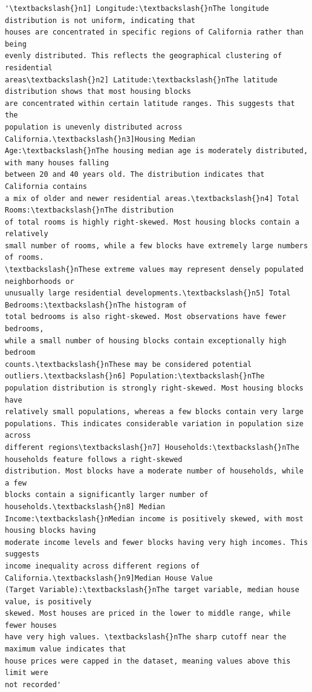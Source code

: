 \documentclass[11pt]{article}
\makeatletter
\newcommand{\boxspacing}{\kern\kvtcb@left@rule\kern\kvtcb@boxsep}
\newcommand{\prompt}[4]{
        {\ttfamily\llap{{\color{#2}[#3]:\hspace{3pt}#4}}\vspace{-\baselineskip}}
    }
\makeatother
\begin{document}
            \begin{tcolorbox}[breakable, size=fbox, boxrule=.5pt, pad at break*=1mm, opacityfill=0]
\prompt{Out}{outcolor}{61}{\boxspacing}
\begin{Verbatim}[commandchars=\\\{\}]
'\textbackslash{}n1] Longitude:\textbackslash{}nThe longitude distribution is not uniform, indicating that
houses are concentrated in specific regions of California rather than being
evenly distributed. This reflects the geographical clustering of residential
areas\textbackslash{}n2] Latitude:\textbackslash{}nThe latitude distribution shows that most housing blocks
are concentrated within certain latitude ranges. This suggests that the
population is unevenly distributed across California.\textbackslash{}n3]Housing Median
Age:\textbackslash{}nThe housing median age is moderately distributed, with many houses falling
between 20 and 40 years old. The distribution indicates that California contains
a mix of older and newer residential areas.\textbackslash{}n4] Total Rooms:\textbackslash{}nThe distribution
of total rooms is highly right-skewed. Most housing blocks contain a relatively
small number of rooms, while a few blocks have extremely large numbers of rooms.
\textbackslash{}nThese extreme values may represent densely populated neighborhoods or
unusually large residential developments.\textbackslash{}n5] Total Bedrooms:\textbackslash{}nThe histogram of
total bedrooms is also right-skewed. Most observations have fewer bedrooms,
while a small number of housing blocks contain exceptionally high bedroom
counts.\textbackslash{}nThese may be considered potential outliers.\textbackslash{}n6] Population:\textbackslash{}nThe
population distribution is strongly right-skewed. Most housing blocks have
relatively small populations, whereas a few blocks contain very large
populations. This indicates considerable variation in population size across
different regions\textbackslash{}n7] Households:\textbackslash{}nThe households feature follows a right-skewed
distribution. Most blocks have a moderate number of households, while a few
blocks contain a significantly larger number of households.\textbackslash{}n8] Median
Income:\textbackslash{}nMedian income is positively skewed, with most housing blocks having
moderate income levels and fewer blocks having very high incomes. This suggests
income inequality across different regions of California.\textbackslash{}n9]Median House Value
(Target Variable):\textbackslash{}nThe target variable, median house value, is positively
skewed. Most houses are priced in the lower to middle range, while fewer houses
have very high values. \textbackslash{}nThe sharp cutoff near the maximum value indicates that
house prices were capped in the dataset, meaning values above this limit were
not recorded'
\end{Verbatim}
\end{tcolorbox}
        
\end{document}

